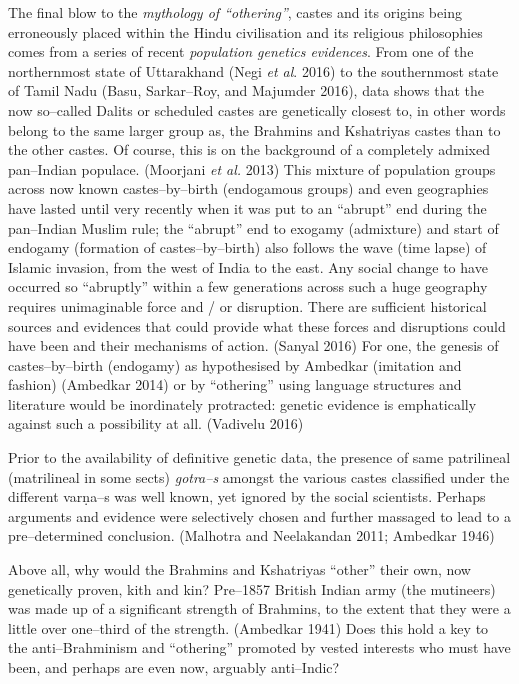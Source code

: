The final blow to the \textit{mythology of “othering”}, castes and its origins being erroneously placed within the Hindu civilisation and its religious philosophies comes from a series of recent \textit{population genetics evidences}. From one of the northernmost state of Uttarakhand (Negi \textit{et al}. 2016) to the southernmost state of Tamil Nadu (Basu, Sarkar–Roy, and Majumder 2016), data shows that the now so–called Dalits or scheduled castes are genetically closest to, in other words belong to the same larger group as, the Brahmins and Kshatriyas castes than to the other castes. Of course, this is on the background of a completely admixed pan–Indian populace. (Moorjani \textit{et al.} 2013) This mixture of population groups across now known castes–by–birth (endogamous groups) and even geographies have lasted until very recently when it was put to an “abrupt” end during the pan–Indian Muslim rule; the “abrupt” end to exogamy (admixture) and start of endogamy (formation of castes–by–birth) also follows the wave (time lapse) of Islamic invasion, from the west of India to the east. Any social change to have occurred so “abruptly” within a few generations across such a huge geography requires unimaginable force and / or disruption. There are sufficient historical sources and evidences that could provide what these forces and disruptions could have been and their mechanisms of action. (Sanyal 2016) For one, the genesis of castes–by–birth (endogamy) as hypothesised by Ambedkar (imitation and fashion) (Ambedkar 2014) or by “othering” using language structures and literature would be inordinately protracted: genetic evidence is emphatically against such a possibility at all. (Vadivelu 2016)

Prior to the availability of definitive genetic data, the presence of same patrilineal (matrilineal in some sects) \textit{gotra–s} amongst the various castes classified under the different varṇa–s was well known, yet ignored by the social scientists. Perhaps arguments and evidence were selectively chosen and further massaged to lead to a pre–determined conclusion. (Malhotra and Neelakandan 2011; Ambedkar 1946)

Above all, why would the Brahmins and Kshatriyas “other” their own, now genetically proven, kith and kin? Pre–1857 British Indian army (the mutineers) was made up of a significant strength of Brahmins, to the extent that they were a little over one–third of the strength. (Ambedkar 1941) Does this hold a key to the anti–Brahminism and “othering” promoted by vested interests who must have been, and perhaps are even now, arguably anti–Indic?

